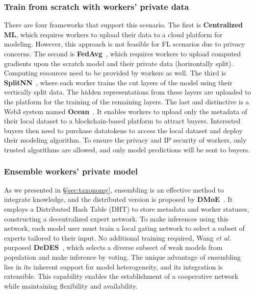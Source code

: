 \subsubsection{Train from scratch with workers' private data}
There are four frameworks that support this scenario. 
The first is \textbf{Centralized ML}, which requires workers to upload their data to a cloud platform for modeling. However, this approach is not feasible for FL scenarios due to privacy concerns. 
The second is \textbf{FedAvg}~\cite{mcmahan2017communication}, which requires workers to upload computed gradients upon the scratch model and their private data (horizontally split). Computing resources need to be provided by workers as well.
The third is \textbf{SplitNN}~\cite{vepakomma2019split}, where each worker trains the cut layers of the model using their vertically split data. 
The hidden representations from these layers are uploaded to the platform for the training of the remaining layers.
The last and distinctive is a Web3 system named \textbf{Ocean}~\cite{mcconaghy2022ocean}.
It enables workers to upload only the metadata of their local dataset to a blockchain-based platform to attract buyers. 
Interested buyers then need to purchase datatokens to access the local dataset and deploy their modeling algorithm. 
To ensure the privacy and IP security of workers, only trusted algorithms are allowed, and only model predictions will be sent to buyers.

\subsubsection{Ensemble workers' private model} %
As we presented in \S\ref{sec:taxonomy}, ensembling is an effective method to integrate knowledge, and the distributed version is proposed by \textbf{DMoE}~\cite{ryabinin2020towards}. 
It employs a Distributed Hash Table (DHT) to store metadata and worker statuses, constructing a decentralized expert network. 
To make inferences using this network, each model user must train a local gating network to select a subset of experts tailored to their input.
No additional training required, Wang \textit{et al.} purposed \textbf{DeDES}~\cite{wang2023data}, which selects a diverse subsect of weak models from population and make inference by voting. 
The unique advantage of ensembling lies in its inherent support for model heterogeneity, and its integration is extensible. 
This capability enables the establishment of a cooperative network while maintaining flexibility and availability.

